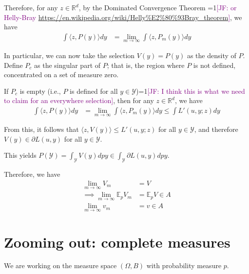 \documentclass{article}
\newcommand{\Comments}{1}
\newcommand{\mynote}[2]{\ifnum\Comments=1\textcolor{#1}{#2}\fi}
\newcommand{\jessie}[1]{\mynote{purple}{[JF: #1]}}
\newcommand{\reals}{\mathbb{R}}
\newcommand{\E}{\mathbb{E}}
\newcommand{\Y}{\mathcal{Y}}
\newcommand{\inprod}[2]{\langle #1, #2 \rangle}%
\begin{document}
Therefore, for any $z \in \reals^d$, by the Dominated Convergence Theorem \jessie{or Helly-Bray \url{https://en.wikipedia.org/wiki/Helly\%E2\%80\%93Bray_theorem}}, we have 
\begin{align*}
\int \inprod{z}{P(y)} dy &= \lim_{m \to \infty} \int \inprod{z}{P_m(y)} dy
\end{align*}

In particular, we can now take the selection $V(y) = P(y)$ as the density of $P$.
Define $P_c$ as the singular part of $P$; that is, the region where $P$ is not defined, concentrated on a set of measure zero.

If $P_c$ is empty (i.e., $P$ is defined for all $y \in \Y$)\jessie{I think this is what we need to claim for an everywhere selection}, then for any $z \in \reals^d$, we have
\begin{align*}
\int \inprod{z}{P(y)} dy &= \lim_{m \to \infty} \int \inprod{z}{P_m(y)} dy \leq \int L'(u,y;z) dy
\end{align*}

From this, it follows that $\inprod{z}{V(y)} \leq L'(u,y;z)$ for all $y \in \Y$, and therefore $V(y) \in \partial L(u,y)$ for all $y \in \Y$.

This yields $P(\Y) = \int_\Y V(y) dpy \in \int_\Y \partial L(u,y) dpy$.

Therefore, we have 
\begin{align*}
\lim_{m\to \infty} V_m &= V \\
\implies \lim_{m \to \infty} \E_p V_m &= \E_p V \in A\\
\lim_{m \to \infty} v_m &= v \in A
\end{align*}

\section{Zooming out: complete measures}
We are working on the measure space $(\Omega, B)$ with probability measure $p$.
\end{document}
